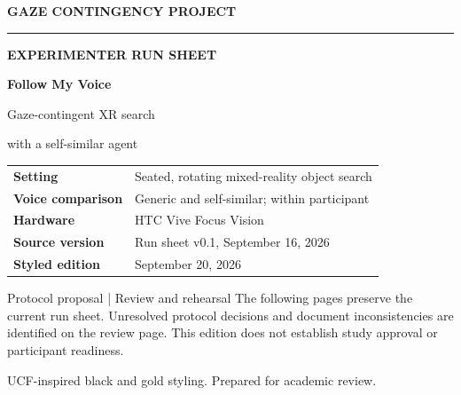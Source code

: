 \documentclass[11pt]{article}
\begin{document}
\hypersetup{pageanchor=false}
\begin{titlepage}
\thispagestyle{empty}
\vspace*{0.45in}
{\small\bfseries\color{UCFGray}GAZE CONTINGENCY PROJECT\par}
\vspace{0.15in}
{\color{UCFGold}\rule{\linewidth}{4pt}}
\vspace{0.25in}
\begin{tcolorbox}[colback=UCFDark,colframe=UCFDark,arc=0mm,left=20pt,right=20pt,top=28pt,bottom=28pt]
{\color{UCFGold}\small\bfseries EXPERIMENTER RUN SHEET\par}
\vspace{12pt}
{\color{white}\fontsize{34}{39}\selectfont\bfseries Follow My Voice\par}
\vspace{12pt}
{\color{white}\Large Gaze-contingent XR search\par with a self-similar agent\par}
\end{tcolorbox}
\vspace{0.25in}
\begin{tabularx}{\linewidth}{@{}lX@{}}
\textbf{Setting} & Seated, rotating mixed-reality object search \\[8pt]
\textbf{Voice comparison} & Generic and self-similar; within participant \\[8pt]
\textbf{Hardware} & HTC Vive Focus Vision \\[8pt]
\textbf{Source version} & Run sheet v0.1, September 16, 2026 \\[8pt]
\textbf{Styled edition} & September 20, 2026 \\
\end{tabularx}
\vfill
\begin{ucfcallout}{Protocol proposal | Review and rehearsal}
The following pages preserve the current run sheet. Unresolved protocol decisions and document inconsistencies are identified on the review page. This edition does not establish study approval or participant readiness.
\end{ucfcallout}
{\small\color{UCFGray}UCF-inspired black and gold styling. Prepared for academic review.}
\end{titlepage}
\hypersetup{pageanchor=true}
\end{document}
